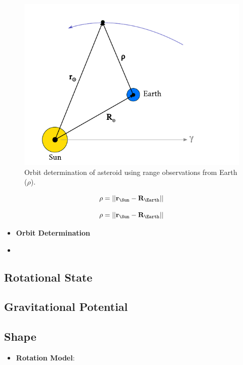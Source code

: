 \begin{figure}[htp]
    \centering
    \includegraphics[width=0.5\linewidth]{graphics/pod-1.pdf}
    \caption{Orbit determination of asteroid using range observations from Earth ($\rho$).}
    \label{fig:my_label}
\end{figure}

\begin{equation}
    \rho = ||\mathbf{r}_\Sun - \mathbf{R}_\Earth||
\end{equation}


\begin{equation}
    \rho = ||\mathbf{r}_\Sun - \mathbf{R}_\Earth||
\end{equation}

\begin{itemize}
    \item \textbf{Orbit Determination}
    \item 
\end{itemize}

\subsection{Rotational State}

\subsection{Gravitational Potential}

\subsection{Shape}

\begin{itemize}
    \item \textbf{Rotation Model}: 
\end{itemize}